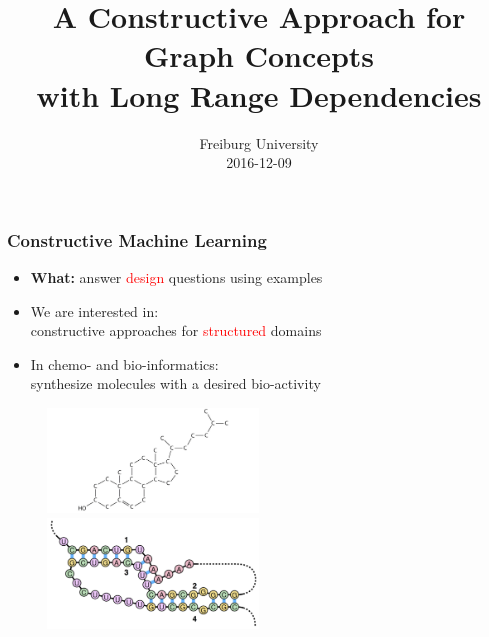 \documentclass{beamer}
\title 
{A Constructive Approach for Graph Concepts \\
with Long Range Dependencies}
\author %
{Fabrizio Costa  \and \underline{Stefan Mautner}
    \small{ 
        \texttt{
            \href{mailto:costa@informatik.uni-freiburg.de}
            {costa@informatik.uni-freiburg.de}}
            \texttt{
            \href{mailto:mautner@informatik.uni-freiburg.de}
            {mautner@informatik.uni-freiburg.de}}
        }
}
\date 
{Freiburg University \\2016-12-09}
\newcommand{\red}[1]{\textcolor{red}{#1}}
\begin{document}
\frame{\titlepage}



\begin{frame}
\frametitle{Constructive Machine Learning}

    \begin{itemize}
        \item {\bf What:} answer \red{design} questions using examples
        \item We are interested in: \\
        constructive approaches for \red{structured} domains
        \item In chemo- and bio-informatics: \\
        synthesize molecules with a desired bio-activity
    \end{itemize}
    \begin{figure}
        \centering
        \includegraphics[width=0.5\textwidth]{images/mol.jpg}
        \includegraphics[width=0.5\textwidth]{images/rna.png}
    \end{figure}    
\end{frame}
\end{document}

